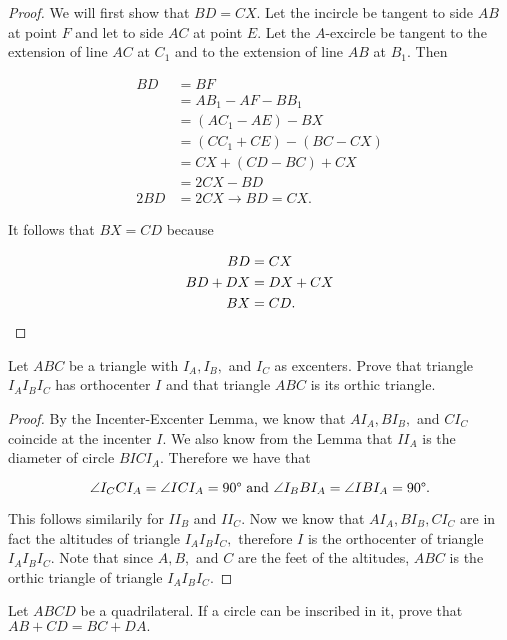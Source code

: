 \documentclass[letterpaper,oneside]{scrartcl}
\begin{document}
\begin{proof}  We will first show that $BD=CX$. Let the incircle be tangent to side $AB$ at point $F$ and let to side $AC$ at point $E$. Let the $A$-excircle be tangent to the extension of line $AC$ at $C_1$ and to the extension of line $AB$ at $B_1$. Then

\begin{align*}
BD &= BF \\
&= AB_1 - AF - BB_1 \\
&= (AC_1 - AE) - BX \\
&= (CC_1 + CE) - (BC - CX) \\
&= CX + (CD - BC) + CX \\
&= 2CX - BD \\
2BD&=2CX \rightarrow BD = CX.
\end{align*}

It follows that $BX=CD$ because

\begin{align*}
BD &= CX \\
BD + DX &= DX + CX \\
BX &= CD. \space 
\end{align*}
\end{proof}
\begin{lemma*}
  [2.24]
  Let $ABC$ be a triangle with $I_A, I_B,$ and $I_C$ as excenters. Prove that triangle $I_AI_BI_C$ has orthocenter $I$ and that triangle $ABC$ is its orthic triangle.
\end{lemma*}

\begin{proof}  By the Incenter-Excenter Lemma, we know that $AI_A, BI_B,$ and $CI_C$ coincide at the incenter $I$. We also know from the Lemma that $II_A$ is the diameter of circle $BICI_A.$ Therefore we have that 

$$\angle {I_CCI_A} = \angle {ICI_A} =  90\degree \text{ and } \angle {I_BBI_A} = \angle {IBI_A} = 90\degree .$$

This follows similarily for $II_B$ and $II_C.$ Now we know that $AI_A, BI_B, CI_C$ are in fact the altitudes of triangle $I_AI_BI_C,$ therefore $I$ is the orthocenter of triangle $I_AI_BI_C.$ Note that since $A,B,$ and $C$ are the feet of the altitudes, $ABC$ is the orthic triangle of triangle $I_AI_BI_C.$ \end{proof}

\begin{theorem*}
  Let $ABCD$ be a quadrilateral. If a circle can be inscribed in it, prove that $AB + CD = BC + DA.$
\end{theorem*}
\end{document}
